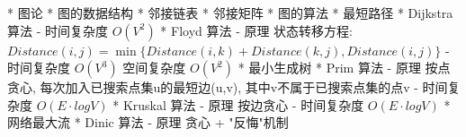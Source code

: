 * 图论
	* 图的数据结构
		* 邻接链表
		* 邻接矩阵
	* 图的算法
		* 最短路径
			* Dijkstra 算法
				\Algorithm
					- 时间复杂度 $O(V^2)$
			* Floyd 算法
				\Algorithm
					- 原理
						状态转移方程:
						$Distance(i,j) = \min\{ Distance(i,k) + Distance(k,j) , Distance(i,j) \}$
					- 时间复杂度 $O(V^3)$
					  空间复杂度 $O(V^2)$
		* 最小生成树
			* Prim 算法
				\Algorithm
					- 原理	
						按点贪心, 每次加入已搜索点集u的最短边(u,v), 其中v不属于已搜索点集的点v
					- 时间复杂度 $O(E·logV)$
			* Kruskal 算法
				\Algorithm
					- 原理
						按边贪心
					- 时间复杂度 $O(E·logV)$
		* 网络最大流
			* Dinic 算法
				\Algorithm
					- 原理
						贪心 + "反悔"机制